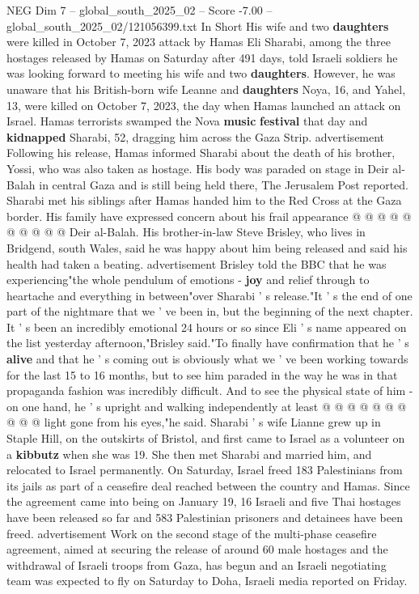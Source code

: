 \begin{textsample}{NEG Dim 7 – global\_south\_2025\_02 – Score -7.00 – global\_south\_2025\_02/121056399.txt}  \label{ex:f7_neg_269}
In Short His wife and two \textbf{daughters} were killed in October 7, 2023 attack by Hamas Eli Sharabi, among the three hostages released by Hamas on Saturday after 491 days, told Israeli soldiers he was looking forward to meeting his wife and two \textbf{daughters}.
However, he was unaware that his British-born wife Leanne and \textbf{daughters} Noya, 16, and Yahel, 13, were killed on October 7, 2023, the day when Hamas launched an attack on Israel.
Hamas terrorists swamped the Nova \textbf{music} \textbf{festival} that day and \textbf{kidnapped} Sharabi, 52, dragging him across the Gaza Strip. advertisement Following his release, Hamas informed Sharabi about the death of his brother, Yossi, who was also taken as hostage.
His body was paraded on stage in Deir al-Balah in central Gaza and is still being held there, The Jerusalem Post reported.
Sharabi met his siblings after Hamas handed him to the Red Cross at the Gaza border.
His family have expressed concern about his frail appearance @ @ @ @ @ @ @ @ @ @ Deir al-Balah.
His brother-in-law Steve Brisley, who lives in Bridgend, south Wales, said he was happy about him being released and said his health had taken a beating. advertisement Brisley told the BBC that he was experiencing"the whole pendulum of emotions - \textbf{joy} and relief through to heartache and everything in between"over Sharabi ' s release."It ' s the end of one part of the nightmare that we ' ve been in, but the beginning of the next chapter.
It ' s been an incredibly emotional 24 hours or so since Eli ' s name appeared on the list yesterday afternoon,"Brisley said."To finally have confirmation that he ' s \textbf{alive} and that he ' s coming out is obviously what we ' ve been working towards for the last 15 to 16 months, but to see him paraded in the way he was in that propaganda fashion was incredibly difficult.
And to see the physical state of him - on one hand, he ' s upright and walking independently at least @ @ @ @ @ @ @ @ @ @ light gone from his eyes,"he said.
Sharabi ' s wife Lianne grew up in Staple Hill, on the outskirts of Bristol, and first came to Israel as a volunteer on a \textbf{kibbutz} when she was 19.
She then met Sharabi and married him, and relocated to Israel permanently.
On Saturday, Israel freed 183 Palestinians from its jails as part of a ceasefire deal reached between the country and Hamas.
Since the agreement came into being on January 19, 16 Israeli and five Thai hostages have been released so far and 583 Palestinian prisoners and detainees have been freed. advertisement Work on the second stage of the multi-phase ceasefire agreement, aimed at securing the release of around 60 male hostages and the withdrawal of Israeli troops from Gaza, has begun and an Israeli negotiating team was expected to fly on Saturday to Doha, Israeli media reported on Friday.

\end{textsample}

